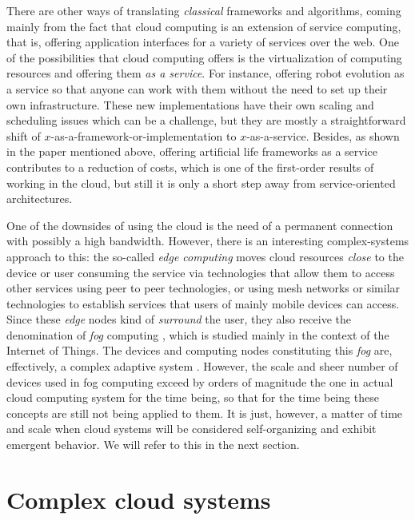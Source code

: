 \documentclass[utf8]{frontiersSCNS} %
\begin{document}
There are other ways of translating {\em classical} frameworks and
algorithms, coming mainly from the fact that cloud computing is an
extension of service computing, that is, offering application
interfaces for a variety of services over the web. One of the possibilities that cloud computing offers
is the virtualization of computing resources and offering them {\em as a
service}. For instance, offering robot evolution as a service
\citep{du2017robot,chen2010robot} so that anyone can work with them without the
need to set up their own infrastructure. These new
implementations have their own scaling and scheduling issues which can
be a challenge, but they are mostly a straightforward shift
of $x$-as-a-framework-or-implementation to $x$-as-a-service. Besides,
as shown in the paper mentioned above, offering artificial life
frameworks as a service contributes to a
reduction of costs, which is one of the first-order results of working
in the cloud, but still it is only a short step away from
service-oriented architectures.


One of the downsides of using the cloud is the need of a permanent connection
with possibly a high bandwidth. However, there is
an interesting complex-systems approach to this: the so-called {\em edge
computing} \citep{satyanarayanan2017edge} moves cloud resources {\em close} to
the device or user consuming the service via technologies that allow them to access other
services using peer to peer technologies, or using mesh networks or
similar technologies to establish services that users of mainly mobile
devices can access. Since these {\em edge} nodes kind of {\em surround} the
user, they also receive the denomination of {\em fog} computing \citep{luan2015fog}, 
which is studied mainly in the context of the Internet
of Things. The devices and computing nodes constituting this {\em fog}
are, effectively, a complex adaptive system
\citep{yan2010application,roca2018tackling}. However, the scale and sheer
number of devices used in fog computing exceed by orders of magnitude
the one in actual cloud computing system for the time being, so that
for the time being these concepts are still not being applied to
them. It is just, however, a matter of time and scale when cloud
systems will be considered self-organizing and exhibit emergent
behavior. We will refer to this in the next section.


\section{Complex cloud systems }
\end{document}

